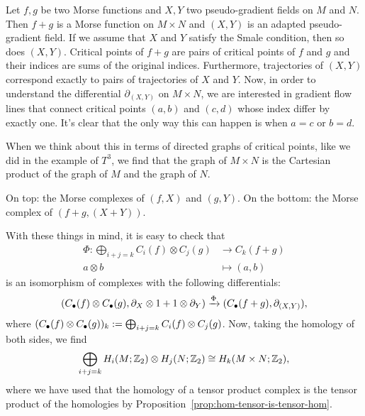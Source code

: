 \begin{myproof}
    Let $f, g$  be two Morse functions and $X, Y$ two pseudo-gradient fields on  $M$ and  $N$.
    Then $f + g$ is a Morse function on $M \times N$ and $(X, Y)$ is an adapted pseudo-gradient field. If we assume that $X$ and  $Y$ satisfy the Smale condition, then so does $(X,Y)$.
    Critical points of $f+g$ are pairs of critical points of $f$ and $g$ and their indices are sums of the original indices.
    Furthermore, trajectories of $(X, Y)$ correspond exactly to pairs of trajectories of $X$ and $Y$.
    Now, in order to understand the differential $\partial_{(X, Y)}$ on $M \times N$, we are interested in gradient flow lines that connect critical points $(a,b)$ and  $(c,d)$ whose index differ by exactly one.
    It's clear that the only way this can happen is when $a = c$ or $b = d$.

    When we think about this in terms of directed graphs of critical points, like we did in the example of $T^{3}$, we find that the graph of $M \times N$ is the Cartesian product of the graph of $M$ and the graph of  $N$.
    \begin{marginfigure}
        \centering
        \caption{On top: the Morse complexes of $(f, X)$ and $(g, Y)$. On the bottom: the Morse complex of $(f+g, (X+Y))$.}
        \label{fig:kunneth-formula}
    \end{marginfigure}
    With these things in mind, it is easy to check that
    \begin{align*}
        \Phi: \bigoplus_{i+j = k} C_i(f) \otimes C_j(g) &\longrightarrow C_k(f+g) \\
        a \otimes b &\longmapsto (a,b)
    \end{align*}
    is an isomorphism of complexes with the following differentials:
    \[
        (C_\bullet(f) \otimes C_\bullet(g), \partial_X \otimes 1 + 1 \otimes \partial_Y) \xrightarrow{\Phi}   (C_\bullet(f+g), \partial_{(X,Y)})
    ,\]
    where $(C_\bullet(f) \otimes C_\bullet(g))_k := \bigoplus_{i+j = k} C_i(f) \otimes C_j(g)$.
    Now, taking the homology of both sides, we find
    \[
        \bigoplus_{i+j = k} H_i(M; \mathbb{Z}_2) \otimes H_j(N; \mathbb{Z}_2) \cong H_k(M \times N; \mathbb{Z}_2)
    ,\]
    where we have used that the homology of a tensor product complex is the tensor product of the homologies by Proposition~\ref{prop:hom-tensor-is-tensor-hom}.
\end{myproof}
